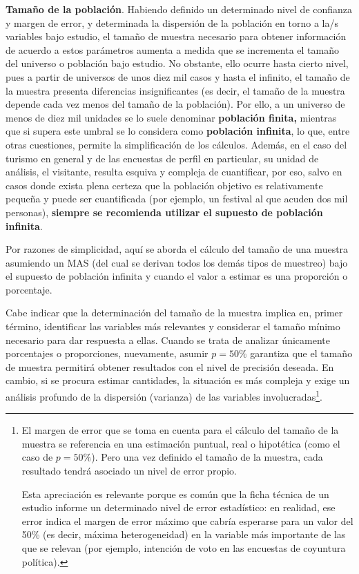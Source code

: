 \documentclass[
]{book}
\begin{document}
\begin{itemize}
  \textbf{Tamaño de la población}. Habiendo definido un determinado nivel de confianza y margen de error, y determinada la dispersión de la población en torno a la/s variables bajo estudio, el tamaño de muestra necesario para obtener información de acuerdo a estos parámetros aumenta a medida que se incrementa el tamaño del universo o población bajo estudio. No obstante, ello ocurre hasta cierto nivel, pues a partir de universos de unos diez mil casos y hasta el infinito, el tamaño de la muestra presenta diferencias insignificantes (es decir, el tamaño de la muestra depende cada vez menos del tamaño de la población). Por ello, a un universo de menos de diez mil unidades se lo suele denominar \textbf{población finita,} mientras que si supera este umbral se lo considera como \textbf{población infinita}, lo que, entre otras cuestiones, permite la simplificación de los cálculos. Además, en el caso del turismo en general y de las encuestas de perfil en particular, su unidad de análisis, el visitante, resulta esquiva y compleja de cuantificar, por eso, salvo en casos donde exista plena certeza que la población objetivo es relativamente pequeña y puede ser cuantificada (por ejemplo, un festival al que acuden dos mil personas), \textbf{siempre se recomienda utilizar el supuesto de población infinita}.
\end{itemize}

Por razones de simplicidad, aquí se aborda el cálculo del tamaño de una muestra asumiendo un MAS (del cual se derivan todos los demás tipos de muestreo) bajo el supuesto de población infinita y cuando el valor a estimar es una proporción o porcentaje.

Cabe indicar que la determinación del tamaño de la muestra implica en, primer término, identificar las variables más relevantes y considerar el tamaño mínimo necesario para dar respuesta a ellas. Cuando se trata de analizar únicamente porcentajes o proporciones, nuevamente, asumir \(p=50\%\) garantiza que el tamaño de muestra permitirá obtener resultados con el nivel de precisión deseada. En cambio, si se procura estimar cantidades, la situación es más compleja y exige un análisis profundo de la dispersión (varianza) de las variables involucradas\footnote{El margen de error que se toma en cuenta para el cálculo del tamaño de la muestra se referencia en una estimación puntual, real o hipotética (como el caso de \(p=50\%\)). Pero una vez definido el tamaño de la muestra, cada resultado tendrá asociado un nivel de error propio.

  Esta apreciación es relevante porque es común que la ficha técnica de un estudio informe un determinado nivel de error estadístico: en realidad, ese error indica el margen de error máximo que cabría esperarse para un valor del 50\% (es decir, máxima heterogeneidad) en la variable más importante de las que se relevan (por ejemplo, intención de voto en las encuestas de coyuntura política).}.
\end{document}
